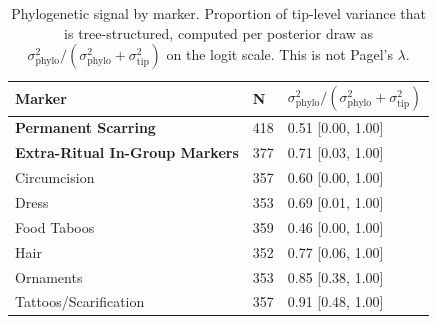 \begin{table}[!ht]
\centering
\small
\caption{Phylogenetic signal by marker. Proportion of tip-level variance that is tree-structured, computed per posterior draw as $\sigma^2_{\mathrm{phylo}} / (\sigma^2_{\mathrm{phylo}} + \sigma^2_{\mathrm{tip}})$ on the logit scale. This is not Pagel's $\lambda$.}
\label{tab:intonly_phylo_signal}
\begin{tabular}{lll}
\toprule
Marker & N & $\sigma^2_{\mathrm{phylo}} / (\sigma^2_{\mathrm{phylo}} + \sigma^2_{\mathrm{tip}})$ \\
\midrule
\textbf{Permanent Scarring} & 418 & 0.51 [0.00, 1.00] \\
\textbf{Extra-Ritual In-Group Markers} & 377 & 0.71 [0.03, 1.00] \\
\midrule
Circumcision & 357 & 0.60 [0.00, 1.00] \\
Dress & 353 & 0.69 [0.01, 1.00] \\
Food Taboos & 359 & 0.46 [0.00, 1.00] \\
Hair & 352 & 0.77 [0.06, 1.00] \\
Ornaments & 353 & 0.85 [0.38, 1.00] \\
Tattoos/Scarification & 357 & 0.91 [0.48, 1.00] \\
\bottomrule
\end{tabular}
\end{table}